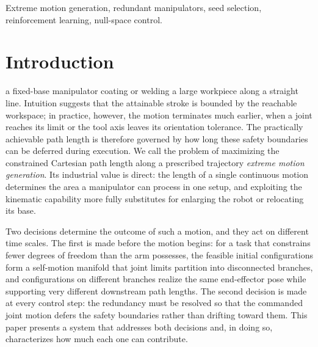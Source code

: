 \documentclass[journal]{IEEEtran}
\begin{document}
\begin{IEEEkeywords}
Extreme motion generation, redundant manipulators, seed selection,
reinforcement learning, null-space control.
\end{IEEEkeywords}

\IEEEpeerreviewmaketitle

\section{Introduction}
\label{sec:intro}
 a fixed-base manipulator coating or welding a
large workpiece along a straight line. Intuition suggests that the
attainable stroke is bounded by the reachable workspace; in practice,
however, the motion terminates much earlier, when a joint reaches its
limit or the tool axis leaves its orientation tolerance. The practically
achievable path length is therefore governed by how long these safety
boundaries can be deferred during execution. We call the problem of
maximizing the constrained Cartesian path length along a prescribed
trajectory \emph{extreme motion generation}. Its industrial value is
direct: the length of a single continuous motion determines the area a
manipulator can process in one setup, and exploiting the kinematic
capability more fully substitutes for enlarging the robot or relocating
its base.

Two decisions determine the outcome of such a motion, and they act on
different time scales. The first is made before the motion begins: for a
task that constrains fewer degrees of freedom than the arm possesses, the
feasible initial configurations form a self-motion manifold that joint
limits partition into disconnected branches, and configurations on
different branches realize the same end-effector pose while supporting
very different downstream path lengths. The second decision is made at
every control step: the redundancy must be resolved so that the commanded
joint motion defers the safety boundaries rather than drifting toward
them. This paper presents a system that addresses both decisions and, in
doing so, characterizes how much each one can contribute.
\end{document}
